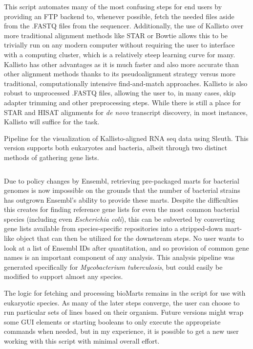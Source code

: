 This script automates many of the most confusing steps for end users by providing an FTP backend to, whenever possible, fetch the needed files aside from the .FASTQ files from the sequencer. Additionally, the use of Kallisto over more traditional alignment methods like STAR or Bowtie allows this to be trivially run on any modern computer without requiring the user to interface with a computing cluster, which is a relatively steep learning curve for many. Kallisto has other advantages as it is much faster and also more accurate than other alignment methods thanks to its pseudoalignment strategy versus more traditional, computationally intensive find\hyp{}and\hyp{}match approaches. Kallisto is also robust to unprocessed .FASTQ files, allowing the user to, in many cases, skip adapter trimming and other preprocessing steps. While there is still a place for STAR and HISAT alignments for \textit{de novo} transcript discovery, in most instances, Kallisto will suffice for the task. 

\begin{code}
\caption{Pipeline for the visualization of Kallisto\hyp{}aligned RNA seq data using Sleuth. This version supports both eukaryotes and bacteria, albeit through two distinct methods of gathering gene lists.}
\label{blinder}

\inputminted[breaklines,frame=single,fontsize=\small]{r}{source/sleuther.R}

\end{code}

Due to policy changes by Ensembl, retrieving pre\hyp{}packaged marts for bacterial genomes is now impossible on the grounds that the number of bacterial strains has outgrown Ensembl's ability to provide these marts. Despite the difficulties this creates for finding reference gene lists for even the most common bacterial species (including even \textit{Escherichia coli}), this can be subverted by converting gene lists available from species\hyp{}specific repositories into a stripped-down mart\hyp{}like object that can then be utilized for the downstream steps. No user wants to look at a list of Ensembl IDs after quantitation, and so provision of common gene names is an important component of any analysis. This analysis pipeline was generated specifically for \textit{Mycobacterium tuberculosis}, but could easily be modified to support almost any species.

The logic for fetching and processing bioMarts remains in the script for use with eukaryotic species. As many of the later steps converge, the user can choose to run particular sets of lines based on their organism. Future versions might wrap some GUI elements or starting booleans to only execute the appropriate commands when needed, but in my experience, it is possible to get a new user working with this script with minimal overall effort.


